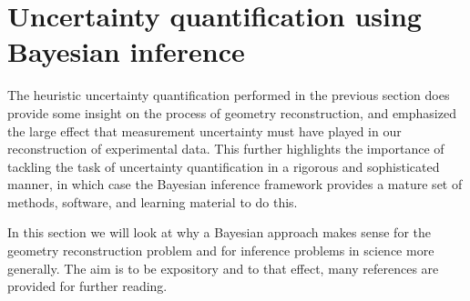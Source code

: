 %
%

\section{Uncertainty quantification using Bayesian inference} \label{sec:uncertaintyBayesian}
The heuristic uncertainty quantification performed in the previous section does provide some insight on the process of geometry reconstruction, and emphasized the large effect that measurement uncertainty must have played in our reconstruction of experimental data. This further highlights the importance of tackling the task of uncertainty quantification in a rigorous and sophisticated manner, in which case the Bayesian inference framework provides a mature set of methods, software, and learning material to do this.

In this section we will look at why a Bayesian approach makes sense for the geometry reconstruction problem and for inference problems in science more generally. The aim is to be expository and to that effect, many references are provided for further reading.

